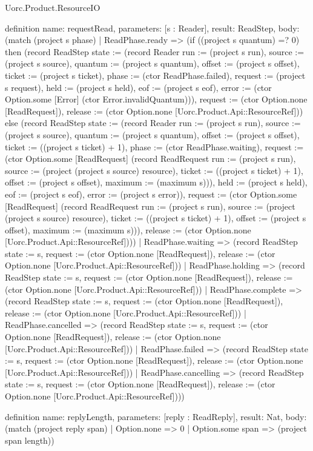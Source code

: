 \begin{lexlean}{Uorc.Product.ResourceIO}
\begin{semanticmodule}
definition{
  name: requestRead,
  parameters: [s : Reader],
  result: ReadStep,
  body: (match (project s phase)
    | ReadPhase.ready => (if ((project s quantum) =? 0) then (record ReadStep {state := (record Reader {run := (project s run), source := (project s source), quantum := (project s quantum), offset := (project s offset), ticket := (project s ticket), phase := (ctor ReadPhase.failed), request := (project s request), held := (project s held), eof := (project s eof), error := (ctor Option.some [Error] (ctor Error.invalidQuantum))}), request := (ctor Option.none [ReadRequest]), release := (ctor Option.none [Uorc.Product.Api::ResourceRef])}) else (record ReadStep {state := (record Reader {run := (project s run), source := (project s source), quantum := (project s quantum), offset := (project s offset), ticket := ((project s ticket) + 1), phase := (ctor ReadPhase.waiting), request := (ctor Option.some [ReadRequest] (record ReadRequest {run := (project s run), source := (project (project s source) resource), ticket := ((project s ticket) + 1), offset := (project s offset), maximum := (maximum s)})), held := (project s held), eof := (project s eof), error := (project s error)}), request := (ctor Option.some [ReadRequest] (record ReadRequest {run := (project s run), source := (project (project s source) resource), ticket := ((project s ticket) + 1), offset := (project s offset), maximum := (maximum s)})), release := (ctor Option.none [Uorc.Product.Api::ResourceRef])}))
    | ReadPhase.waiting => (record ReadStep {state := s, request := (ctor Option.none [ReadRequest]), release := (ctor Option.none [Uorc.Product.Api::ResourceRef])})
    | ReadPhase.holding => (record ReadStep {state := s, request := (ctor Option.none [ReadRequest]), release := (ctor Option.none [Uorc.Product.Api::ResourceRef])})
    | ReadPhase.complete => (record ReadStep {state := s, request := (ctor Option.none [ReadRequest]), release := (ctor Option.none [Uorc.Product.Api::ResourceRef])})
    | ReadPhase.cancelled => (record ReadStep {state := s, request := (ctor Option.none [ReadRequest]), release := (ctor Option.none [Uorc.Product.Api::ResourceRef])})
    | ReadPhase.failed => (record ReadStep {state := s, request := (ctor Option.none [ReadRequest]), release := (ctor Option.none [Uorc.Product.Api::ResourceRef])})
    | ReadPhase.cancelling => (record ReadStep {state := s, request := (ctor Option.none [ReadRequest]), release := (ctor Option.none [Uorc.Product.Api::ResourceRef])}))
}

definition{
  name: replyLength,
  parameters: [reply : ReadReply],
  result: Nat,
  body: (match (project reply span) | Option.none => 0 | Option.some span => (project span length))
}


\end{semanticmodule}
\end{lexlean}
